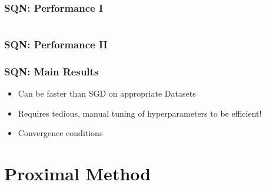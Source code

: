 \documentclass[10pt]{beamer}
\begin{document}
  \begin{frame}
    \frametitle{SQN: Performance I}

      \begin{columns}[T]
      \begin{column}{.5\textwidth}
        \resizebox{\linewidth}{!}{}
      \end{column}\hfill
      \begin{column}{.5\textwidth}
        \resizebox{\linewidth}{!}{}
      \end{column}
    \end{columns}
  \end{frame}

  \begin{frame}
    \frametitle{SQN: Performance II}
    \resizebox{0.8\linewidth}{!}{}
  \end{frame}

  \begin{frame}\frametitle{SQN: Main Results}
    \begin{itemize}
      \item Can be faster than SGD on appropriate Datasets
      \item Requires tedious, manual tuning of hyperparameters to be efficient!
      \item Convergence conditions
    \end{itemize}
  
  \end{frame}

 \section{Proximal Method}
\end{document}
